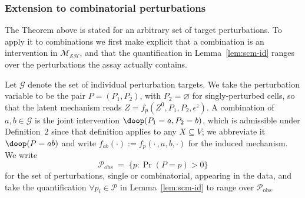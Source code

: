 %
%
%

\subsubsection{Extension to combinatorial perturbations}

The Theorem above is stated for an arbitrary set of target perturbations. To apply it to
combinations we first make explicit that a combination is an intervention in $\mathcal{M_{SH}}$, and
that the quantification in Lemma~\ref{lem:scm-id} ranges over the perturbations the assay actually
contains.

\begin{definition}\label{def:combo-int}
    Let $\mathcal{G}$ denote the set of individual perturbation targets. We take the perturbation
    variable to be the pair $P = (P_1, P_2)$, with $P_2 = \varnothing$ for singly-perturbed cells,
    so that the latent mechanism reads $Z = f_p(Z^0, P_1, P_2, \epsilon^z)$. A combination of
    $a, b \in \mathcal{G}$ is the joint intervention $\doop(P_1 = a, P_2 = b)$, which is admissible
    under Definition~2 since that definition applies to any $X \subseteq V$; we abbreviate it
    $\doop(P = ab)$ and write $f_{ab}(\cdot) := f_p(\cdot\,, a, b, \cdot)$ for the induced mechanism.
    We write
    \[
      \mathcal{P}_{\mathrm{obs}} \;=\; \{p : \Pr(P = p) > 0\}
    \]
    for the set of perturbations, single or combinatorial, appearing in the data, and take the
    quantification $\forall p_i \in \mathcal{P}$ in Lemma~\ref{lem:scm-id} to range over
    $\mathcal{P}_{\mathrm{obs}}$.
\end{definition}

